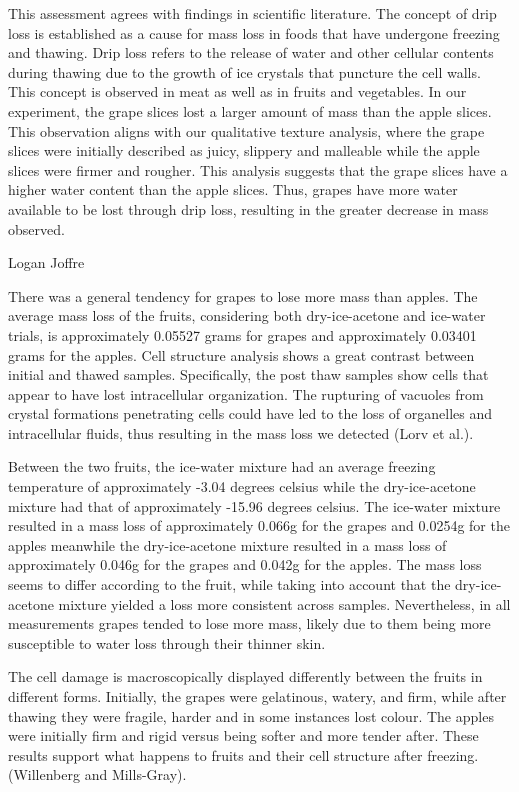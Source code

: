 This assessment agrees with findings in scientific literature. The
concept of drip loss is established as a cause for mass loss in foods
that have undergone freezing and thawing. Drip loss refers to the
release of water and other cellular contents during thawing due to the
growth of ice crystals that puncture the cell walls. This concept is
observed in meat as well as in fruits and vegetables. In our experiment,
the grape slices lost a larger amount of mass than the apple slices.
This observation aligns with our qualitative texture analysis, where the
grape slices were initially described as juicy, slippery and malleable
while the apple slices were firmer and rougher. This analysis suggests
that the grape slices have a higher water content than the apple slices.
Thus, grapes have more water available to be lost through drip loss,
resulting in the greater decrease in mass observed.

Logan Joffre

There was a general tendency for grapes to lose more mass than apples.
The average mass loss of the fruits, considering both dry-ice-acetone
and ice-water trials, is approximately 0.05527 grams for grapes and
approximately 0.03401 grams for the apples. Cell structure analysis
shows a great contrast between initial and thawed samples. Specifically,
the post thaw samples show cells that appear to have lost intracellular
organization. The rupturing of vacuoles from crystal formations
penetrating cells could have led to the loss of organelles and
intracellular fluids, thus resulting in the mass loss we detected (Lorv
et al.).

Between the two fruits, the ice-water mixture had an average freezing
temperature of approximately -3.04 degrees celsius while the
dry-ice-acetone mixture had that of approximately -15.96 degrees
celsius. The ice-water mixture resulted in a mass loss of approximately
0.066g for the grapes and 0.0254g for the apples meanwhile the
dry-ice-acetone mixture resulted in a mass loss of approximately 0.046g
for the grapes and 0.042g for the apples. The mass loss seems to differ
according to the fruit, while taking into account that the
dry-ice-acetone mixture yielded a loss more consistent across samples.
Nevertheless, in all measurements grapes tended to lose more mass,
likely due to them being more susceptible to water loss through their
thinner skin.

The cell damage is macroscopically displayed differently between the
fruits in different forms. Initially, the grapes were gelatinous,
watery, and firm, while after thawing they were fragile, harder and in
some instances lost colour. The apples were initially firm and rigid
versus being softer and more tender after. These results support what
happens to fruits and their cell structure after freezing. (Willenberg
and Mills-Gray).

